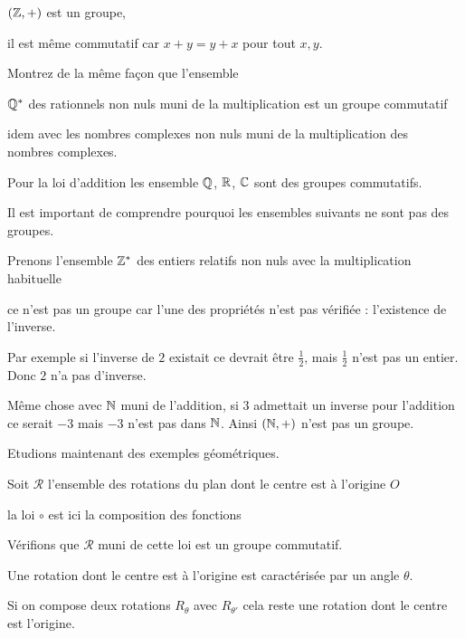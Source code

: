 $(\mathbb{Z},+)$ est un groupe,

\change

il est même commutatif car $x+y=y+x$ pour tout $x,y$.

\diapo

Montrez de la même façon que l'ensemble 

 $\mathbb{Q}^*$ des rationnels non nuls muni de la multiplication est un groupe commutatif

  idem avec les nombres complexes non nuls muni de la multiplication des\\ nombres complexes.

\change

Pour la loi d'addition les ensemble $\mathbb{Q}$, $\mathbb{R}$, $\mathbb{C}$ sont des groupes commutatifs.

\change

Il est important de comprendre pourquoi les ensembles suivants ne sont pas 
des groupes.

Prenons l'ensemble $\mathbb{Z}^*$ des entiers relatifs non nuls avec la multiplication habituelle

ce n'est pas un groupe car l'une des propriétés n'est pas vérifiée :
l'existence de l'inverse.

Par exemple si l'inverse de $2$ existait ce devrait être $\frac 12$,
mais $\frac 12$ n'est pas un entier. Donc $2$ n'a pas d'inverse.


Même chose avec $\mathbb{N}$ muni de l'addition, si $3$ admettait un inverse pour l'addition ce serait $-3$
mais $-3$ n'est pas dans $\mathbb{N}$. Ainsi $(\mathbb{N},+)$ n'est pas un groupe.



\diapo

Etudions maintenant des exemples géométriques.

Soit $\mathcal{R}$ l'ensemble des rotations du plan dont le centre est à l'origine $O$

la loi $\circ$ est ici la composition des fonctions

Vérifions que $\mathcal{R}$ muni de cette loi est un groupe commutatif.

\change

Une rotation dont le centre est à l'origine est caractérisée par un angle $\theta$.

\change

Si on compose deux rotations  $R_\theta$ avec $R_{\theta'}$ cela reste une rotation 
dont le centre est l'origine.

